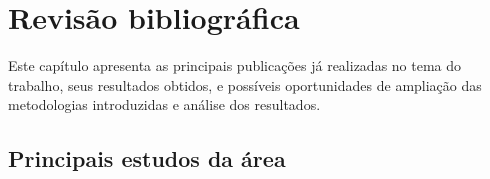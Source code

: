 



\chapter{Revisão bibliográfica}%

Este capítulo apresenta as principais publicações já realizadas no tema do trabalho,
seus resultados obtidos, e possíveis oportunidades de ampliação das metodologias introduzidas e análise dos resultados.

\section{Principais estudos da área}


